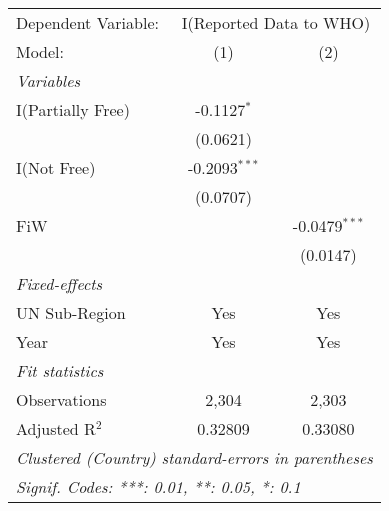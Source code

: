 
\begingroup
\centering
\begin{tabular}{lcc}
   \tabularnewline \midrule \midrule
   Dependent Variable: & \multicolumn{2}{c}{I(Reported Data to WHO)}\\
   Model:            & (1)             & (2)\\  
   \midrule
   \emph{Variables}\\
   I(Partially Free) & -0.1127$^{*}$   &   \\   
                     & (0.0621)        &   \\   
   I(Not Free)       & -0.2093$^{***}$ &   \\   
                     & (0.0707)        &   \\   
   FiW               &                 & -0.0479$^{***}$\\   
                     &                 & (0.0147)\\   
   \midrule
   \emph{Fixed-effects}\\
   UN Sub-Region     & Yes             & Yes\\  
   Year              & Yes             & Yes\\  
   \midrule
   \emph{Fit statistics}\\
   Observations      & 2,304           & 2,303\\  
   Adjusted R$^2$    & 0.32809         & 0.33080\\  
   \midrule \midrule
   \multicolumn{3}{l}{\emph{Clustered (Country) standard-errors in parentheses}}\\
   \multicolumn{3}{l}{\emph{Signif. Codes: ***: 0.01, **: 0.05, *: 0.1}}\\
\end{tabular}
\par\endgroup


